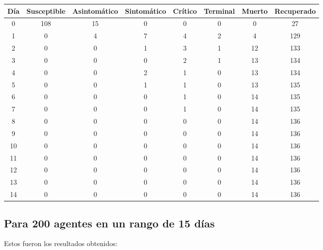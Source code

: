 \begin{center}
\begin{tabular}{|c|c|c|c|c|c|c|c|}
\hline
Día & Susceptible & Asintomático & Sintomático & Crítico & Terminal & Muerto & Recuperado \\
\hline
0 & 108 & 15 & 0 & 0 & 0 & 0 & 27 \\
1 & 0 & 4 & 7 & 4 & 2 & 4 & 129 \\
2 & 0 & 0 & 1 & 3 & 1 & 12 & 133 \\
3 & 0 & 0 & 0 & 2 & 1 & 13 & 134 \\
4 & 0 & 0 & 2 & 1 & 0 & 13 & 134 \\
5 & 0 & 0 & 1 & 1 & 0 & 13 & 135 \\
6 & 0 & 0 & 0 & 1 & 0 & 14 & 135 \\
7 & 0 & 0 & 0 & 1 & 0 & 14 & 135 \\
8 & 0 & 0 & 0 & 0 & 0 & 14 & 136 \\
9 & 0 & 0 & 0 & 0 & 0 & 14 & 136 \\
10 & 0 & 0 & 0 & 0 & 0 & 14 & 136 \\
11 & 0 & 0 & 0 & 0 & 0 & 14 & 136 \\
12 & 0 & 0 & 0 & 0 & 0 & 14 & 136 \\
13 & 0 & 0 & 0 & 0 & 0 & 14 & 136 \\
14 & 0 & 0 & 0 & 0 & 0 & 14 & 136 \\
\hline
\end{tabular}
\end{center}

\subsection{Para 200 agentes en un rango de 15 días}
Estos fueron los resultados obtenidos:

